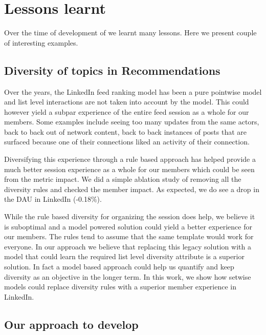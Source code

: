 

\section{Lessons learnt}
Over the time of development of {\systemname} we learnt many lessons. Here we present couple of interesting examples.
\subsection{Diversity of topics in Recommendations}

Over the years, the LinkedIn feed ranking model has been a pure pointwise model and list level interactions are not taken into account by the model. This could however yield a subpar experience of the entire feed session as a whole for our members. Some examples include seeing too many updates from the same actors, back to back out of network content, back to back instances of posts that are surfaced because one of their connections liked an activity of their connection. 

Diversifying this experience through a rule based approach has helped provide a much better session experience as a whole for our members which could be seen from the metric impact. 
We did a simple ablation study of removing all the diversity rules and checked the member impact. As expected, we do see a drop in the DAU in LinkedIn (-0.18\%).

While the rule based diversity for organizing the session does help, we believe it is suboptimal and a model powered solution could yield a better experience for our members. The rules tend to assume that the same template would work for everyone. In our approach we believe that replacing this legacy solution with a model that could learn the required list level diversity attribute is a superior solution.  In fact a model based approach could help us quantify and keep diversity as an objective in the longer term. In this work, we show how setwise models could replace diversity rules with a superior member experience in LinkedIn.


\subsection{Our approach to develop {\systemname}}

